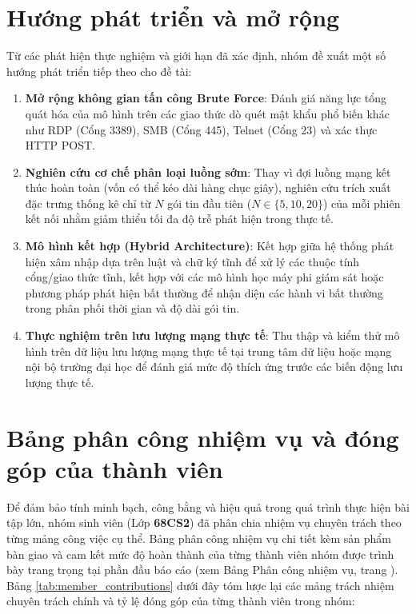 \section{Hướng phát triển và mở rộng}
\label{sec:future_work}

Từ các phát hiện thực nghiệm và giới hạn đã xác định, nhóm đề xuất một số hướng phát triển tiếp theo cho đề tài:
\begin{enumerate}
    \item \textbf{Mở rộng không gian tấn công Brute Force}: Đánh giá năng lực tổng quát hóa của mô hình trên các giao thức dò quét mật khẩu phổ biến khác như RDP (Cổng 3389), SMB (Cổng 445), Telnet (Cổng 23) và xác thực HTTP POST.
    \item \textbf{Nghiên cứu cơ chế phân loại luồng sớm}: Thay vì đợi luồng mạng kết thúc hoàn toàn (vốn có thể kéo dài hàng chục giây), nghiên cứu trích xuất đặc trưng thống kê chỉ từ $N$ gói tin đầu tiên ($N \in \{5, 10, 20\}$) của mỗi phiên kết nối nhằm giảm thiểu tối đa độ trễ phát hiện trong thực tế.
    \item \textbf{Mô hình kết hợp (Hybrid Architecture)}: Kết hợp giữa hệ thống phát hiện xâm nhập dựa trên luật và chữ ký tĩnh để xử lý các thuộc tính cổng/giao thức tĩnh, kết hợp với các mô hình học máy phi giám sát hoặc phương pháp phát hiện bất thường để nhận diện các hành vi bất thường trong phân phối thời gian và độ dài gói tin.
    \item \textbf{Thực nghiệm trên lưu lượng mạng thực tế}: Thu thập và kiểm thử mô hình trên dữ liệu lưu lượng mạng thực tế tại trung tâm dữ liệu hoặc mạng nội bộ trường đại học để đánh giá mức độ thích ứng trước các biến động lưu lượng thực tế.
\end{enumerate}

\vspace{\baselineskip}
\section{Bảng phân công nhiệm vụ và đóng góp của thành viên}
\label{sec:member_contributions}

Để đảm bảo tính minh bạch, công bằng và hiệu quả trong quá trình thực hiện bài tập lớn, nhóm sinh viên (Lớp \textbf{68CS2}) đã phân chia nhiệm vụ chuyên trách theo từng mảng công việc cụ thể. Bảng phân công nhiệm vụ chi tiết kèm sản phẩm bàn giao và cam kết mức độ hoàn thành của từng thành viên nhóm được trình bày trang trọng tại phần đầu báo cáo (xem Bảng Phân công nhiệm vụ, trang \pageref{page:contributions}). Bảng \ref{tab:member_contributions} dưới đây tóm lược lại các mảng trách nhiệm chuyên trách chính và tỷ lệ đóng góp của từng thành viên trong nhóm:

